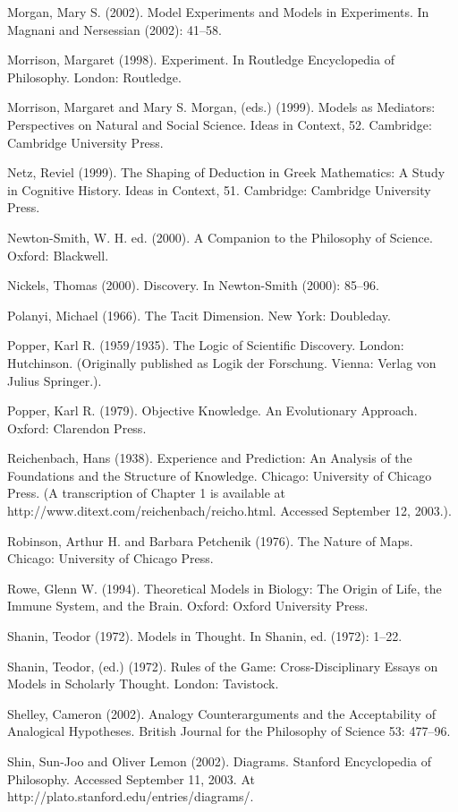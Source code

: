 Morgan, Mary S. (2002). Model Experiments and Models in Experiments. In Magnani and Nersessian (2002): 41–58.

Morrison, Margaret (1998). Experiment. In Routledge Encyclopedia of Philosophy. London: Routledge.

Morrison, Margaret and Mary S. Morgan, (eds.) (1999). Models as Mediators: Perspectives on Natural and Social Science. Ideas in Context, 52. Cambridge: Cambridge University Press.

Netz, Reviel (1999). The Shaping of Deduction in Greek Mathematics: A Study in Cognitive History. Ideas in Context, 51. Cambridge: Cambridge University Press.

Newton-Smith, W. H. ed. (2000). A Companion to the Philosophy of Science. Oxford: Blackwell.

Nickels, Thomas (2000). Discovery. In Newton-Smith (2000): 85–96.

Polanyi, Michael (1966). The Tacit Dimension. New York: Doubleday.

Popper, Karl R. (1959/1935). The Logic of Scientific Discovery. London: Hutchinson. (Originally published as Logik der Forschung. Vienna: Verlag von Julius Springer.).

Popper, Karl R. (1979). Objective Knowledge. An Evolutionary Approach. Oxford: Clarendon Press.

Reichenbach, Hans (1938). Experience and Prediction: An Analysis of the Foundations and the Structure of Knowledge. Chicago: University of Chicago Press. (A transcription of Chapter 1 is available at http://www.ditext.com/reichenbach/reicho.html. Accessed September 12, 2003.).

Robinson, Arthur H. and Barbara Petchenik (1976). The Nature of Maps. Chicago: University of Chicago Press.

Rowe, Glenn W. (1994). Theoretical Models in Biology: The Origin of Life, the Immune System, and the Brain. Oxford: Oxford University Press.

Shanin, Teodor (1972). Models in Thought. In Shanin, ed. (1972): 1–22.

Shanin, Teodor, (ed.) (1972). Rules of the Game: Cross-Disciplinary Essays on Models in Scholarly Thought. London: Tavistock.

Shelley, Cameron (2002). Analogy Counterarguments and the Acceptability of Analogical Hypotheses. British Journal for the Philosophy of Science 53: 477–96.

Shin, Sun-Joo and Oliver Lemon (2002). Diagrams. Stanford Encyclopedia of Philosophy. Accessed September 11, 2003. At http://plato.stanford.edu/entries/diagrams/.

